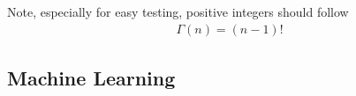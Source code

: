 \documentclass[jcp,aip,amsmath]{revtex4-1}
\begin{document}
Note, especially for easy testing, positive integers should follow
\begin{align}
\Gamma(n)=(n-1)!
\end{align}





\subsection{Machine Learning}
\end{document}
